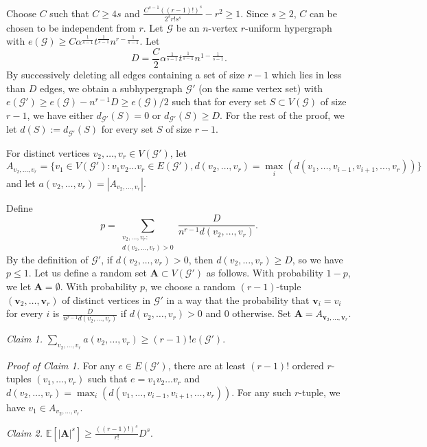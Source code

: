 \documentclass[a4paper,11pt]{article}
\makeatletter
\renewenvironment{proof}[1][\proofname] {\par\pushQED{\qed}\normalfont\topsep6\p@\@plus6\p@\relax\trivlist\item[\hskip\labelsep\bfseries#1\@addpunct{.}]\ignorespaces}{\popQED\endtrivlist\@endpefalse}
\theoremstyle{definition}
\def\vv{\textbf{v}}
\def\vA{\textbf{A}}
\def\cG{\mathcal{G}}
\makeatother
\begin{document}
\begin{proof}[Proof of Theorem \ref{thm:dependent random choice}]
Choose $C$ such that $C\geq 4s$ and $\frac{C^{s-1}((r-1)!)^s}{2^{s}r!s^s}-r^2\geq 1$. Since $s\geq 2$, $C$ can be chosen to be independent from $r$. Let $\cG$ be an $n$-vertex $r$-uniform hypergraph with $e(\cG)\geq C\alpha^{\frac{1}{s-1}}t^{\frac{1}{s-1}}n^{r-\frac{1}{s-1}}$. Let
$$D=\frac{C}{2}\alpha^{\frac{1}{s-1}}t^{\frac{1}{s-1}}n^{1-\frac{1}{s-1}}.$$
By successively deleting all edges containing a set of size $r-1$ which lies in less than $D$ edges, we obtain a subhypergraph $\cG'$ (on the same vertex set) with $e(\cG')\geq e(\cG) - n^{r-1}D \ge e(\cG)/2$ such that for every set $S\subset V(\cG)$ of size $r-1$, we have either $d_{\cG'}(S)=0$ or $d_{\cG'}(S)\geq D$. For the rest of the proof, we let $d(S):=d_{\cG'}(S)$ for every set $S$ of size $r-1$. 

For distinct vertices $v_2,\dots,v_{r}\in V(\cG')$, let $$A_{v_2,\dots,v_{r}}=\{v_1\in V(\cG'): v_1v_2\dots v_{r}\in E(\cG'), d(v_2,\dots,v_r)=\max_i(d(v_1,\dots,v_{i-1},v_{i+1},\dots,v_r))\}$$
and let $a(v_2,\dots,v_{r})=|A_{v_2,\dots,v_{r}}|$.

Define $$p=\sum_{\substack{v_2,\dots,v_r: \\ d(v_2,\dots,v_r)>0}} \frac{D}{n^{r-1} d(v_2,\dots,v_r)}.$$
By the definition of $\cG'$, if $d(v_2,\dots,v_r)>0$, then $d(v_2,\dots,v_r)\geq D$, so we have $p\leq 1$. Let us define a random set $\vA\subset V(\cG')$ as follows. With probability $1-p$, we let $\vA=\emptyset$. With probability $p$, we choose a random $(r-1)$-tuple $(\vv_2,\dots,\vv_r)$ of distinct vertices in $\cG'$ in a way that the probability that $\vv_i=v_i$ for every $i$ is $\frac{D}{n^{r-1} d(v_2,\dots,v_r)}$ if $d(v_2,\dots,v_r)>0$ and $0$ otherwise. Set $\vA=A_{\vv_2,\dots,\vv_r}$.

\medskip

\noindent \emph{Claim 1.} $\sum_{v_2,\dots,v_r} a(v_2,\dots,v_r)\geq (r-1)!e(\cG')$.

\medskip

\noindent \emph{Proof of Claim 1.} For any $e\in E(\cG')$, there are at least $(r-1)!$ ordered $r$-tuples $(v_1,\dots,v_r)$ such that $e=v_1v_2\dots v_r$ and $d(v_2,\dots,v_r)=\max_i(d(v_1,\dots,v_{i-1},v_{i+1},\dots,v_r))$. For any such $r$-tuple, we have $v_1\in A_{v_2,\dots,v_r}$.

\medskip

\noindent \emph{Claim 2.} $\mathbb{E}[|\vA|^s]\geq \frac{((r-1)!)^s}{r!}D^s$.


\end{proof}
\end{document}
